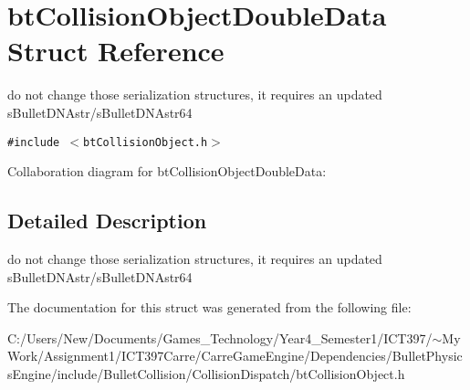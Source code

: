 \hypertarget{structbt_collision_object_double_data}{
\section{btCollisionObjectDoubleData Struct Reference}
\label{structbt_collision_object_double_data}
}
do not change those serialization structures, it requires an updated sBulletDNAstr/sBulletDNAstr64  


{\tt \#include $<$btCollisionObject.h$>$}

Collaboration diagram for btCollisionObjectDoubleData:

\subsection{Detailed Description}
do not change those serialization structures, it requires an updated sBulletDNAstr/sBulletDNAstr64 

The documentation for this struct was generated from the following file:\begin{CompactItemize}
\item 
C:/Users/New/Documents/Games\_\-Technology/Year4\_\-Semester1/ICT397/$\sim$My Work/Assignment1/ICT397Carre/CarreGameEngine/Dependencies/BulletPhysicsEngine/include/BulletCollision/CollisionDispatch/btCollisionObject.h\end{CompactItemize}
